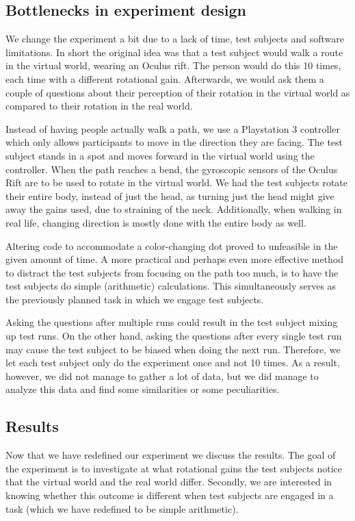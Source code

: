 \subsection{Bottlenecks in experiment design}
We change the experiment a bit due to a lack of time, test subjects and software limitations.
In short the original idea was that a test subject would walk a route in the virtual world, wearing an Oculus rift.
The person would do this 10 times, each time with a different rotational gain.
Afterwards, we would ask them a couple of questions about their perception of their rotation in the virtual world as compared to their rotation in the real world.

Instead of having people actually walk a path, we use a Playstation 3 controller which only allows participants to move in the direction they are facing.
The test subject stands in a spot and moves forward in the virtual world using the controller.
When the path reaches a bend, the gyroscopic sensors of the Oculus Rift are to be used to rotate in the virtual world.
We had the test subjects rotate their entire body, instead of just the head, as turning just the head might give away the gains used, due to straining of the neck.
Additionally, when walking in real life, changing direction is mostly done with the entire body as well.

Altering code to accommodate a color-changing dot proved to unfeasible in the given amount of time.
A more practical and perhaps even more effective method to distract the test subjects from focusing on the path too much, is to have the test subjects do simple (arithmetic) calculations.
This simultaneously serves as the previously planned task in which we engage test subjects.

Asking the questions after multiple runs could result in the test subject mixing up test runs.
On the other hand, asking the questions after every single test run may cause the test subject to be biased when doing the next run.
Therefore, we let each test subject only do the experiment once and not 10 times.
As a result, however, we did not manage to gather a lot of data, but we did manage to analyze this data and find some similarities or some peculiarities.

\subsection{Results}
Now that we have redefined our experiment we discuss the results.
The goal of the experiment is to investigate at what rotational gains the test subjects notice that the virtual world and the real world differ.
Secondly, we are interested in knowing whether this outcome is different when test subjects are engaged in a task (which we have redefined to be simple arithmetic).


